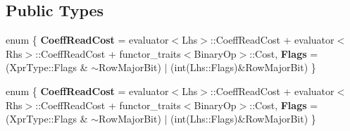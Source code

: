 \subsection*{Public Types}
\begin{DoxyCompactItemize}
\item 
\mbox{\label{struct_eigen_1_1internal_1_1binary__evaluator_3_01_cwise_binary_op_3_01_binary_op_00_01_lhs_00_0cb5b32f8780f5e04222972f8f6ae2d90_ae9f36b674e69e4f99afc8ae08dfc3464}} 
enum \{ {\bfseries Coeff\+Read\+Cost} = evaluator$<$Lhs$>$\+:\+:Coeff\+Read\+Cost + evaluator$<$Rhs$>$\+:\+:Coeff\+Read\+Cost + functor\+\_\+traits$<$Binary\+Op$>$\+:\+:Cost, 
{\bfseries Flags} = (Xpr\+Type\+:\+:Flags \& $\sim$\+Row\+Major\+Bit) $\vert$ (int(Lhs\+:\+:Flags)\&Row\+Major\+Bit)
 \}
\item 
\mbox{\label{struct_eigen_1_1internal_1_1binary__evaluator_3_01_cwise_binary_op_3_01_binary_op_00_01_lhs_00_0cb5b32f8780f5e04222972f8f6ae2d90_ac1de03fa10a2c240ded4a61a7f48daf0}} 
enum \{ {\bfseries Coeff\+Read\+Cost} = evaluator$<$Lhs$>$\+:\+:Coeff\+Read\+Cost + evaluator$<$Rhs$>$\+:\+:Coeff\+Read\+Cost + functor\+\_\+traits$<$Binary\+Op$>$\+:\+:Cost, 
{\bfseries Flags} = (Xpr\+Type\+:\+:Flags \& $\sim$\+Row\+Major\+Bit) $\vert$ (int(Lhs\+:\+:Flags)\&Row\+Major\+Bit)
 \}
\end{DoxyCompactItemize}
